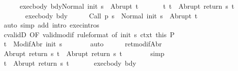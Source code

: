 \begin{isabellebody}
\ \ \ \ \isamarkupfalse%
\ exec{\isacharunderscore}body{\isacharcolon}\ {\isachardoublequoteopen}{\isasymGamma}{\isasymturnstile}{\isasymlangle}bdy{\isacharcomma}Normal\ {\isacharparenleft}init\ s{\isacharparenright}{\isasymrangle}\ {\isasymRightarrow}\ Abrupt\ t{\isacharprime}{\isachardoublequoteclose}\ \isanewline
\ \ \ \ \isamarkupfalse%
\ t{\isacharcolon}\ {\isachardoublequoteopen}t\ {\isacharequal}\ Abrupt\ {\isacharparenleft}return\ s\ t{\isacharprime}{\isacharparenright}{\isachardoublequoteclose}\isanewline
\ \ \ \ \isamarkupfalse%
\ \isamarkupfalse%
\ exec{\isacharunderscore}body\ bdy\isanewline
\ \ \ \ \isamarkupfalse%
\ {\isachardoublequoteopen}{\isasymGamma}{\isasymturnstile}{\isasymlangle}Call\ {\isacharparenleft}p\ s{\isacharparenright}\ \ {\isacharcomma}Normal\ {\isacharparenleft}init\ s{\isacharparenright}{\isasymrangle}\ {\isasymRightarrow}\ Abrupt\ t{\isacharprime}{\isachardoublequoteclose}\isanewline
\ \ \ \ \ \ \isamarkupfalse%
\ {\isacharparenleft}auto\ simp\ add{\isacharcolon}\ intro{\isacharcolon}\ exec{\isachardot}intros{\isacharparenright}\isanewline
\ \ \ \ \isamarkupfalse%
\ cvalidD\ {\isacharbrackleft}OF\ valid{\isacharunderscore}modif{\isacharprime}\ {\isacharbrackleft}rule{\isacharunderscore}format{\isacharcomma}\ of\ {\isachardoublequoteopen}init\ s{\isachardoublequoteclose}{\isacharbrackright}\ ctxt{\isacharprime}\ this{\isacharbrackright}\ P\isanewline
\ \ \ \ \isamarkupfalse%
\ {\isachardoublequoteopen}t{\isacharprime}\ {\isasymin}\ ModifAbr\ {\isacharparenleft}init\ s{\isacharparenright}{\isachardoublequoteclose}\isanewline
\ \ \ \ \ \ \isamarkupfalse%
\ auto\isanewline
\ \ \ \ \isamarkupfalse%
\ ret{\isacharunderscore}modifAbr\ \isamarkupfalse%
\ {\isachardoublequoteopen}Abrupt\ {\isacharparenleft}return\ s\ t{\isacharprime}{\isacharparenright}\ {\isacharequal}\ Abrupt\ {\isacharparenleft}return{\isacharprime}\ s\ t{\isacharprime}{\isacharparenright}{\isachardoublequoteclose}\isanewline
\ \ \ \ \ \ \isamarkupfalse%
\ simp\isanewline
\ \ \ \ \isamarkupfalse%
\ \isamarkupfalse%
\ {\isachardoublequoteopen}t\ {\isacharequal}\ Abrupt\ {\isacharparenleft}return{\isacharprime}\ s\ t{\isacharprime}{\isacharparenright}{\isachardoublequoteclose}\ \isacommand{{\isachardot}}\isamarkupfalse%
\isanewline
\ \ \ \ \isamarkupfalse%
\ exec{\isacharunderscore}body\ bdy\isanewline
\ \ \ \ \isamarkupfalse%

\end{isabellebody}
